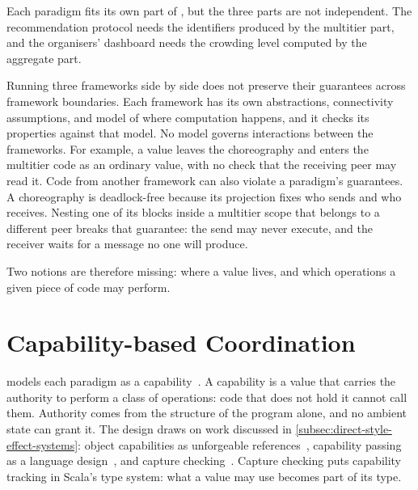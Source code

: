 Each paradigm fits its own part of \cityevt, but the three parts are not independent.
%
The recommendation protocol needs the identifiers produced by the multitier part,
and the organisers' dashboard needs the crowding level computed by the aggregate part.

Running three frameworks side by side does not preserve their guarantees across framework boundaries.
%
Each framework has its own abstractions, connectivity assumptions, and model of where computation happens,
and it checks its properties against that model.
%
No model governs interactions between the frameworks.
For example, a value leaves the choreography and enters the multitier code as an ordinary value,
with no check that the receiving peer may read it.
%
Code from another framework can also violate a paradigm's guarantees.
%
A choreography is deadlock-free because its projection fixes who sends and who receives.
%
Nesting one of its blocks inside a multitier scope that belongs to a different peer breaks that guarantee:
the send may never execute, and the receiver waits for a message no one will produce.

Two notions are therefore missing: where a value lives, and which operations a given piece of code may perform.

\section{Capability-based Coordination}
\label{sec:capabilities-unification}

\camil models each paradigm as a capability~\cite{Farabegoli:2026:CaMiL}.
%
A capability is a value that carries the authority to perform a class of operations:
code that does not hold it cannot call them.
%
Authority comes from the structure of the program alone, and no ambient state can grant it.
%
The design draws on work discussed in \cref{subsec:direct-style-effect-systems}:
object capabilities as unforgeable references~\cite{miller2003capability},
capability passing as a language design~\cite{brachthaeuser2020effekt,10.1145/3428194},
and capture checking~\cite{DBLP:journals/toplas/BoruchGruszeckiOLLB23}.
%
Capture checking puts capability tracking in Scala's type system: what a value may use becomes part of its type.

